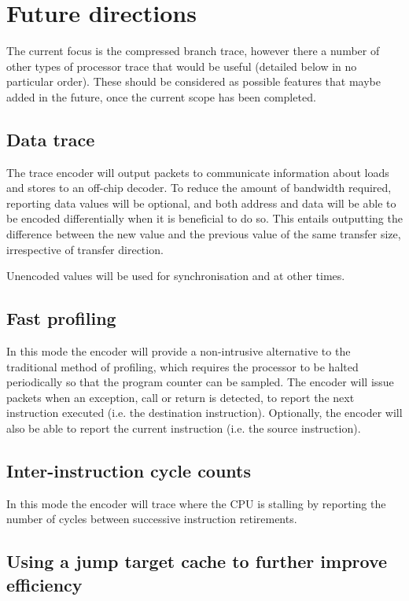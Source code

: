 \chapter{Future directions} \label{Future}

The current focus is the compressed branch trace, however there a
number of other types of processor trace that would be useful 
(detailed below in no particular order). These
should be considered as possible features that maybe added in the future,
once the current scope has been completed.

\section{Data trace}

The trace encoder will output packets to communicate information
about loads and stores to an off-chip decoder.  To reduce the amount
of bandwidth required, reporting data values will be optional, and
both address and data will be able to be encoded differentially when
it is beneficial to do so.  This entails outputting the difference
between the new value and the previous value of the same transfer
size, irrespective of transfer direction.

Unencoded values will be used for synchronisation and at other times.

\section{Fast profiling}

In this mode the encoder will provide a non-intrusive alternative to
the traditional method of profiling, which requires the processor to
be halted periodically so that the program counter can be sampled.
The encoder will issue packets when an exception, call or return is
detected, to report the next instruction executed (i.e. the
destination instruction).  Optionally, the encoder will also be able to
report the current instruction (i.e. the source instruction).

\section{Inter-instruction cycle counts}

In this mode the encoder will trace where the CPU is stalling by
reporting the number of cycles between successive instruction
retirements.

\section{Using a jump target cache to further improve efficiency}

